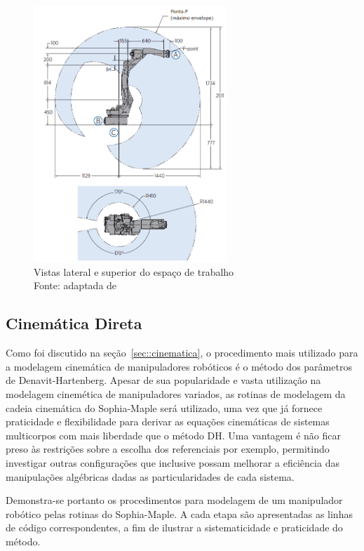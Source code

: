 \begin{figure}[h]
	\centering 
 	\includegraphics[width=0.65\textwidth]{figs/workspace}
 	\caption[Vistas lateral e superior do espaço de trabalho]{Vistas lateral e
 	superior do espaço de trabalho \\Fonte: adaptada de~\cite{manualmh12}}
 	\label{fig::workspace}
\end{figure}


\subsection{Cinemática Direta}\label{sec::dkin}

Como foi discutido na seção~\ref{sec::cinematica}, o procedimento mais utilizado
para a modelagem cinemática de manipuladores robóticos é o método dos parâmetros
de Denavit-Hartenberg. Apesar de sua popularidade e vasta utilização na
modelagem cinemética de manipuladores variados, as rotinas de modelagem da
cadeia cinemática do Sophia-Maple será utilizado, uma vez que já fornece
praticidade e flexibilidade para derivar as equações cinemáticas de sistemas
multicorpos com mais liberdade que o método DH. Uma vantagem é não ficar
preso às restrições sobre a escolha dos referenciais por exemplo, permitindo
investigar outras configurações que inclusive possam melhorar a eficiência das
manipulações algébricas dadas as particularidades de cada sistema.

Demonstra-se portanto os procedimentos para modelagem de um manipulador robótico
pelas rotinas do Sophia-Maple. A cada etapa são apresentadas as linhas de código
correspondentes, a fim de ilustrar a sistematicidade e praticidade do método.


